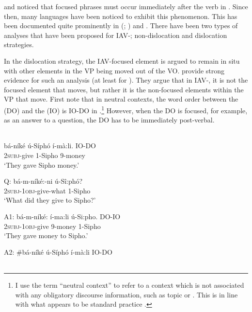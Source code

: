 \documentclass[output=paper
,newtxmath
,modfonts
,nonflat]{langsci/langscibook}
\begin{document}
\citet{hyman1979nounstructure} and \citet{watters1979} noticed that focused phrases must occur immediately after the verb in . Since then, many  languages have been noticed to exhibit this phenomenon. This has been documented quite prominently in  (\citealt{Buell2009}; \citealt{chengdowning2012}) and  \citep{vanderwal2006}. There have been two types of analyses that have been proposed for IAV-; non-dislocation and dislocation strategies. 

In the dislocation strategy, the IAV-focused element is argued to remain in situ with other elements in the VP being moved out of the VO. \citet{chengdowning2012} provide strong evidence for such an analysis (at least for ). They argue that in  IAV-, it is not the focused element that moves, but rather it is the non-focused elements within the VP that move. First note that in neutral contexts, the word order between the  (DO) and the  (IO) is IO-DO in .\footnote{I use the term “neutral context” to refer to a context which is not associated with any obligatory discourse information, such as topic or . This is in line with what appears to be standard practice \citep{Diercks2013,diercks2015}.}  However, when the DO is focused, for example, as an answer to a question, the DO has to be immediately post-verbal.

\ea\label{ex:selvanathan:1}
 \citep[2]{chengdowning2012}\\

\ea\label{ex:selvanathan:1a}
\gll bá-níké   ú-Síphó  í-mà:li.       IO-DO \\
\textsc{2subj}{}-give  1-Sipho     9-money {} \\
\glt ‘They gave Sipho money.’

\ex\label{ex:selvanathan:1b}
	Q: \gll bá-m-níké:-ni      ú-Sî:phó? \\
	\textsc{2subj}{}-\textsc{1obj}{}-give-what    1-Sipho \\
	\glt ‘What did they give to Sipho?’

	A1: \gll bá-m-níké:      í-ma:li   ú-Si:pho.    DO-IO \\
	\textsc{2subj}{}-\textsc{1obj}{}-give   9-money   1-Sipho \\
	\glt ‘They gave money to Sipho.’

	A2: \gll \#bá-níké   ú-Síphó  í-mà:li    IO-DO \\
	\\
\z
\z
\end{document}
